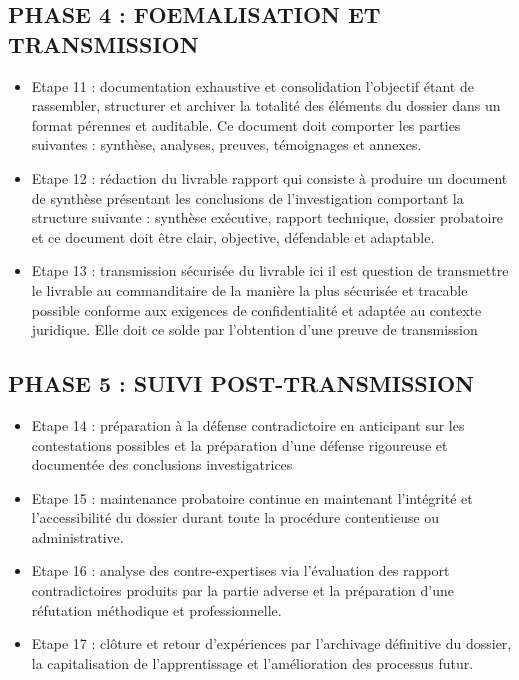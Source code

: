 \documentclass{article}
\begin{document}
\subsection*{PHASE 4 : FOEMALISATION ET TRANSMISSION}
\begin{itemize}
     

	\item Etape 11 : documentation exhaustive et consolidation l’objectif étant de rassembler, structurer et archiver la totalité des éléments du dossier dans un format pérennes et auditable. Ce document doit comporter les parties suivantes : synthèse, analyses, preuves, témoignages et annexes. 
	\item Etape 12 : rédaction du livrable rapport qui consiste à produire un document de synthèse présentant les conclusions de l’investigation comportant la structure suivante : synthèse exécutive, rapport technique, dossier probatoire et ce document doit être clair, objective, défendable et adaptable.
	\item Etape 13 : transmission sécurisée du livrable ici il est question de transmettre le livrable au commanditaire de la manière la plus sécurisée et tracable possible conforme aux exigences de confidentialité et adaptée au contexte juridique. Elle doit ce solde par l’obtention d’une preuve de transmission
\end{itemize}
\subsection*{PHASE 5 : SUIVI POST-TRANSMISSION}
\begin{itemize}
     

	\item Etape 14 : préparation à la défense contradictoire en anticipant sur les contestations possibles et la préparation d’une défense rigoureuse et documentée des conclusions investigatrices
	\item Etape 15 : maintenance probatoire continue en maintenant l’intégrité et l’accessibilité du dossier durant toute la procédure contentieuse ou administrative.
	\item Etape 16 : analyse des contre-expertises via l’évaluation des rapport contradictoires produits par la partie adverse et la préparation d’une réfutation méthodique et professionnelle.
	\item Etape 17 : clôture et retour d’expériences par l’archivage définitive du dossier, la capitalisation de l’apprentissage et l’amélioration des processus futur. 
\end{itemize}
\end{document}
